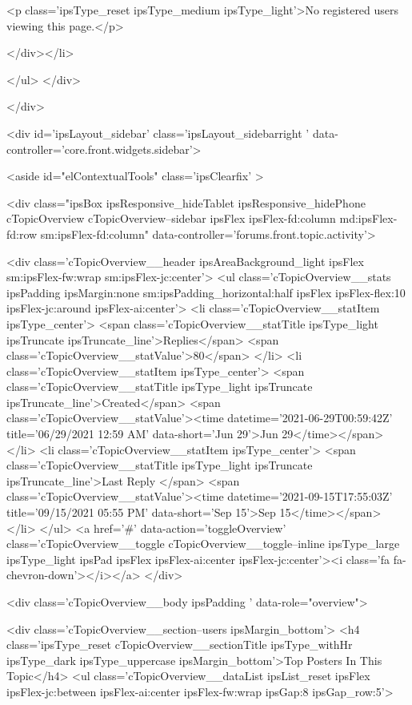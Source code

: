 		<p class='ipsType_reset ipsType_medium ipsType_light'>No registered users viewing this page.</p>
	
</div></li>
				
			
		</ul>
	</div>

							</div>
							


	<div id='ipsLayout_sidebar' class='ipsLayout_sidebarright ' data-controller='core.front.widgets.sidebar'>
		
		
			<aside id="elContextualTools" class='ipsClearfix' >
				







<div class="ipsBox ipsResponsive_hideTablet ipsResponsive_hidePhone cTopicOverview cTopicOverview--sidebar ipsFlex ipsFlex-fd:column md:ipsFlex-fd:row sm:ipsFlex-fd:column" data-controller='forums.front.topic.activity'>

	<div class='cTopicOverview__header ipsAreaBackground_light ipsFlex sm:ipsFlex-fw:wrap sm:ipsFlex-jc:center'>
		<ul class='cTopicOverview__stats ipsPadding ipsMargin:none sm:ipsPadding_horizontal:half ipsFlex ipsFlex-flex:10 ipsFlex-jc:around ipsFlex-ai:center'>
			<li class='cTopicOverview__statItem ipsType_center'>
				<span class='cTopicOverview__statTitle ipsType_light ipsTruncate ipsTruncate_line'>Replies</span>
				<span class='cTopicOverview__statValue'>80</span>
			</li>
			<li class='cTopicOverview__statItem ipsType_center'>
				<span class='cTopicOverview__statTitle ipsType_light ipsTruncate ipsTruncate_line'>Created</span>
				<span class='cTopicOverview__statValue'><time datetime='2021-06-29T00:59:42Z' title='06/29/2021 12:59  AM' data-short='Jun 29'>Jun 29</time></span>
			</li>
			<li class='cTopicOverview__statItem ipsType_center'>
				<span class='cTopicOverview__statTitle ipsType_light ipsTruncate ipsTruncate_line'>Last Reply </span>
				<span class='cTopicOverview__statValue'><time datetime='2021-09-15T17:55:03Z' title='09/15/2021 05:55  PM' data-short='Sep 15'>Sep 15</time></span>
			</li>
		</ul>
		<a href='#' data-action='toggleOverview' class='cTopicOverview__toggle cTopicOverview__toggle--inline ipsType_large ipsType_light ipsPad ipsFlex ipsFlex-ai:center ipsFlex-jc:center'><i class='fa fa-chevron-down'></i></a>
	</div>
	
	<div class='cTopicOverview__body ipsPadding ' data-role="overview">
		
			<div class='cTopicOverview__section--users ipsMargin_bottom'>
				<h4 class='ipsType_reset cTopicOverview__sectionTitle ipsType_withHr ipsType_dark ipsType_uppercase ipsMargin_bottom'>Top Posters In This Topic</h4>
				<ul class='cTopicOverview__dataList ipsList_reset ipsFlex ipsFlex-jc:between ipsFlex-ai:center ipsFlex-fw:wrap ipsGap:8 ipsGap_row:5'>
					
